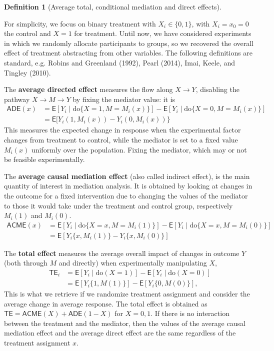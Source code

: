 \documentclass[
  11pt,
  letterpaper,
]{scrbook}
\theoremstyle{definition}
\newtheorem{definition}{Definition}[chapter]
\theoremstyle{definition}
\theoremstyle{remark}
\begin{document}
\begin{definition}[Average total, conditional mediation and direct
effects]\protect\hypertarget{def-ate}{}\label{def-ate}

For simplicity, we focus on binary treatment with \(X_i \in \{0,1\}\),
with \(X_i=x_0=0\) the control and \(X=1\) for treatment. Until now, we
have considered experiments in which we randomly allocate participants
to groups, so we recovered the overall effect of treatment abstracting
from other variables. The following definitions are standard, e.g.
Robins and Greenland (1992), Pearl (2014), Imai, Keele, and Tingley
(2010).

The \textbf{average directed effect} measures the flow along
\(X \rightarrow Y\), disabling the pathway \(X \to M \to Y\) by fixing
the mediator value: it is \begin{align*}
\mathsf{ADE}(x) &= 
\mathsf{E}[Y_i \mid \text{do}\{X=1, M=M_i(x)\}] - \mathsf{E}[Y_i \mid \text{do}\{X=0, M=M_i(x)\}] \\&= \mathsf{E}[Y_i(1,M_i(x)) -Y_i(0, M_i(x))\}
\end{align*} This measures the expected change in response when the
experimental factor changes from treatment to control, while the
mediator is set to a fixed value \(M_i(x)\) uniformly over the
population. Fixing the mediator, which may or not be feasible
experimentally.

The \textbf{average causal mediation effect} (also called indirect
effect), is the main quantity of interest in mediation analysis. It is
obtained by looking at changes in the outcome for a fixed intervention
due to changing the values of the mediator to those it would take under
the treatment and control group, respectively \(M_i(1)\) and \(M_i(0)\).
\begin{align*}
\mathsf{ACME}(x) &= 
\mathsf{E}[Y_i \mid \text{do}\{X=x, M=M_i(1)\}] - \mathsf{E}[Y_i \mid \text{do}\{X=x, M=M_i(0)\}] \\&= \mathsf{E}[Y_i\{x, M_i(1)\} -Y_i\{x, M_i(0)\}]
\end{align*}

The \textbf{total effect} measures the average overall impact of changes
in outcome \(Y\) (both through \(M\) and directly) when experimentally
manipulating \(X\), \begin{align*}
\mathsf{TE}_i &= \mathsf{E}[ Y_i \mid \text{do}(X=1)] - \mathsf{E}[ Y_i \mid \text{do}(X=0)]
\\ &= \mathsf{E}[Y_i\{1, M(1)\}] - \mathsf{E}[Y_i\{0, M(0)\}],
\end{align*} This is what we retrieve if we randomize treatment
assignment and consider the average change in average response. The
total effect is obtained as
\(\mathsf{TE} = \mathsf{ACME}(X) + \mathsf{ADE}(1-X)\) for \(X=0,1.\) If
there is no interaction between the treatment and the mediator, then the
values of the average causal mediation effect and the average direct
effect are the same regardless of the treatment assignment \(x\).

\end{definition}
\end{document}
